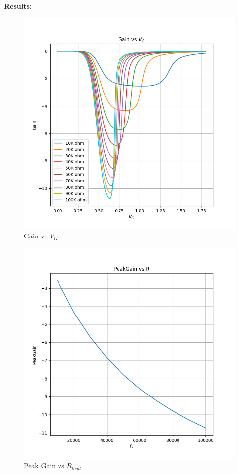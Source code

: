 \documentclass{article}
\begin{document}
\textbf{Results:}
\begin{figure}[!ht]
    \centering
    \includegraphics[scale=0.75]{Images/5b_Gain.png}
    \caption{Gain vs $V_G$}
\end{figure}
\begin{figure}[!ht]
    \centering
    \includegraphics[scale=0.5]{Images/5b_PeakGain.png}
    \caption{Peak Gain vs $R_{load}$}
\end{figure}
\end{document}

